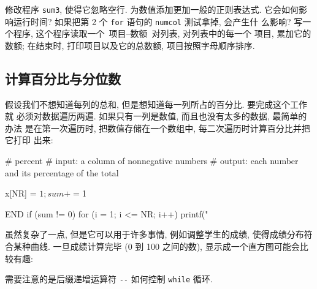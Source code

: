\exercise 修改程序 \verb'sum3', 使得它忽略空行.
\exercise 为数值添加更加一般的正则表达式. 它会如何影响运行时间?
\exercise 如果把第 2 个 \verb'for' 语句的 \verb'numcol' 测试拿掉, 会产生什
么影响?
\exercise 写一个程序, 这个程序读取一个\ 项目--数额\ 对列表, 对列表中的每一个
项目, 累加它的数额; 在结束时, 打印项目以及它的总数额, 项目按照字母顺序排序.

\subsection{计算百分比与分位数}
\label{subsec:computing_percentages_and_quantiles}

假设我们不想知道每列的总和, 但是想知道每一列所占的百分比. 要完成这个工作就
必须对数据遍历两遍. 如果只有一列是数值, 而且也没有太多的数据, 最简单的办法
是在第一次遍历时, 把数值存储在一个数组中, 每二次遍历时计算百分比并把它打印
出来:
\begin{awkcode}
     # percent
     #   input:  a column of nonnegative numbers
     #   output: each number and its percentage of the total
     
         { x[NR] = $1; sum += $1 }
     
     END { if (sum != 0)
               for (i = 1; i <= NR; i++)
                   printf("%
         }
\end{awkcode}

虽然复杂了一点, 但是它可以用于许多事情, 例如调整学生的成绩, 使得成绩分布符
合某种曲线. 一旦成绩计算完毕 (0 到 100 之间的数), 显示成一个直方图可能会比
较有趣:
需要注意的是后缀递增运算符 \verb'--' 如何控制 \verb'while' 循环.

